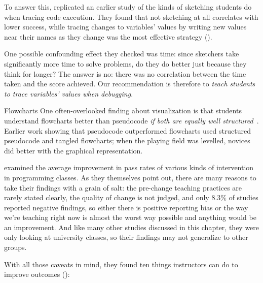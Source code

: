 To answer this, \cite{Cunn2017} replicated an earlier study of the kinds of sketching students do when tracing code execution. They found that not sketching at all correlates with lower success, while tracing changes to variables' values by writing new values near their names as they change was the most effective strategy ().

One possible confounding effect they checked was time: since sketchers take significantly more time to solve problems, do they do better just because they think for longer? The answer is no: there was no correlation between the time taken and the score achieved. Our recommendation is therefore to \emph{teach students to trace variables' values when debugging}.

\begin{aside}{Flowcharts}
  One often-overlooked finding about visualization is that students understand flowcharts better than pseudocode \emph{if both are equally well structured}~\cite{Scan1989}. Earlier work showing that pseudocode outperformed flowcharts used structured pseudocode and tangled flowcharts; when the playing field was levelled, novices did better with the graphical representation.
\end{aside}


\cite{Viha2014} examined the average improvement in pass rates of various kinds of intervention in programming classes. As they themselves point out, there are many reasons to take their findings with a grain of salt: the pre-change teaching practices are rarely stated clearly, the quality of change is not judged, and only 8.3\% of studies reported negative findings, so either there is positive reporting bias or the way we're teaching right now is almost the worst way possible and anything would be an improvement. And like many other studies discussed in this chapter, they were only looking at university classes, so their findings may not generalize to other groups.

With all those caveats in mind, they found ten things instructors can do to improve outcomes ():

